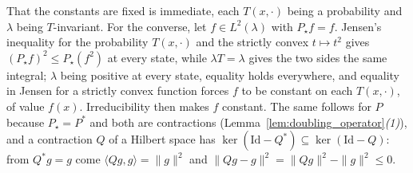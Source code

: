 That the constants are fixed is immediate, each $T(x,\cdot)$ being a probability and
$\lambda$ being $T$-invariant. For the converse, let $f\in L^2(\lambda)$ with
$P_\star f=f$. Jensen's inequality for the probability $T(x,\cdot)$ and the strictly convex
$t\mapsto t^2$ gives $(P_\star f)^2\leq P_\star(f^2)$ at every state, while $\lambda T=\lambda$
gives the two sides the same integral; $\lambda$ being positive at every state, equality holds
everywhere, and equality in Jensen for a strictly convex function forces $f$ to be constant on
each $T(x,\cdot)$, of value $f(x)$. Irreducibility then makes $f$ constant. The same follows
for $P$ because $P_\star=P^*$ and both are contractions
(Lemma~\ref{lem:doubling_operator}\emph{(1)}), and a contraction $Q$ of a Hilbert space has
$\ker(\mathrm{Id}-Q^*)\subseteq\ker(\mathrm{Id}-Q)$: from $Q^*g=g$ come
$\langle Qg,g\rangle=\|g\|^2$ and $\|Qg-g\|^2=\|Qg\|^2-\|g\|^2\leq0$.
